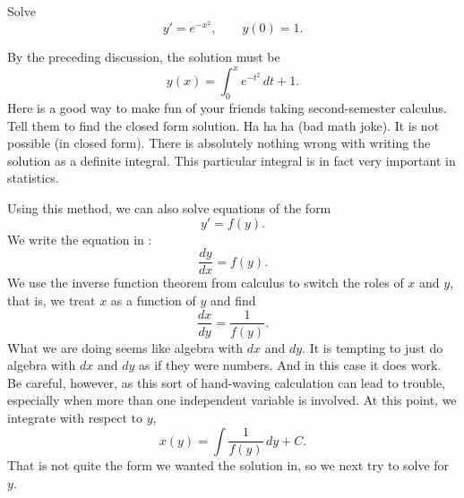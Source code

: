 \begin{example}
Solve
\begin{equation*}
y' = e^{-x^2}, \qquad y(0) = 1 .
\end{equation*}

By the preceding discussion, the solution must be
\begin{equation*}
y(x) = \int_0^x e^{-t^2} \,dt + 1 .
\end{equation*}
Here is a good way to make fun of your friends taking second-semester
calculus.  Tell them to
find the closed form solution.  Ha ha ha (bad math joke).  It is
not possible (in closed form).
There is absolutely nothing wrong with writing the solution as a
definite integral.
This particular integral
is in fact very important
in statistics.
\end{example}

Using this method, we can also solve equations of the form
\begin{equation*}
y' = f(y) .
\end{equation*}
We write the equation in :
\begin{equation*}
\frac{dy}{dx} = f(y) .
\end{equation*}
We use the inverse function theorem from calculus
to switch the roles of $x$ and $y$, that is,
we treat $x$ as a function of $y$ and find
\begin{equation*}
\frac{dx}{dy} = \frac{1}{f(y)} .
\end{equation*}
What
we are doing seems like algebra with $dx$ and $dy$.
It is tempting to just do algebra with $dx$
and $dy$ as if they were numbers.  And in this case it does work.  Be
careful,
however, as this sort of hand-waving calculation can lead to trouble,
especially when
more than one independent variable is involved.
At this point, we integrate with respect to $y$,
\begin{equation*}
x(y) = \int \frac{1}{f(y)} \,dy + C .
\end{equation*}
That is not quite the form we wanted the solution in, so we
next try to solve for $y$.

